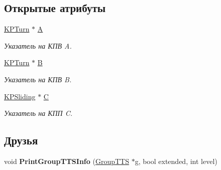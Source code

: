 \subsection*{Открытые атрибуты}
\begin{DoxyCompactItemize}
\item 
\hypertarget{class_group_t_t_s_a489c16b3c3c44eada4d238951db47dc1}{
\hyperlink{class_k_p_turn}{KPTurn} $\ast$ \hyperlink{class_group_t_t_s_a489c16b3c3c44eada4d238951db47dc1}{A}}
\label{class_group_t_t_s_a489c16b3c3c44eada4d238951db47dc1}

\begin{DoxyCompactList}\small\item\em Указатель на КПВ A. \item\end{DoxyCompactList}\item 
\hypertarget{class_group_t_t_s_a0220cbe5e2d099ff7dde9befc4ae464a}{
\hyperlink{class_k_p_turn}{KPTurn} $\ast$ \hyperlink{class_group_t_t_s_a0220cbe5e2d099ff7dde9befc4ae464a}{B}}
\label{class_group_t_t_s_a0220cbe5e2d099ff7dde9befc4ae464a}

\begin{DoxyCompactList}\small\item\em Указатель на КПВ B. \item\end{DoxyCompactList}\item 
\hypertarget{class_group_t_t_s_a4e82ef22141f9c5b06e9379269c282d7}{
\hyperlink{class_k_p_sliding}{KPSliding} $\ast$ \hyperlink{class_group_t_t_s_a4e82ef22141f9c5b06e9379269c282d7}{C}}
\label{class_group_t_t_s_a4e82ef22141f9c5b06e9379269c282d7}

\begin{DoxyCompactList}\small\item\em Указатель на КПП C. \item\end{DoxyCompactList}\end{DoxyCompactItemize}
\subsection*{Друзья}
\begin{DoxyCompactItemize}
\item 
\hypertarget{class_group_t_t_s_aa0d0db1213c61d2c1cc399aa1aa4c779}{
void {\bfseries PrintGroupTTSInfo} (\hyperlink{class_group_t_t_s}{GroupTTS} $\ast$g, bool extended, int level)}
\label{class_group_t_t_s_aa0d0db1213c61d2c1cc399aa1aa4c779}

\end{DoxyCompactItemize}


